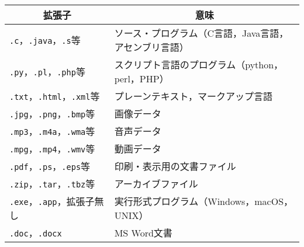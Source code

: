 \documentclass{standalone}
\begin{document}
\begin{tabular}{l|l}\hline\hline
  \multicolumn{1}{c|}{拡張子} & \multicolumn{1}{c}{意味} \\\hline
              {\tt .c}，{\tt .java}，{\tt .s}等     &
              ソース・プログラム（C言語，Java言語，アセンブリ言語）  \\
              {\tt .py}，{\tt .pl}，{\tt .php}等    &
              スクリプト言語のプログラム（python，perl，PHP）        \\
              {\tt .txt}，{\tt .html}，{\tt .xml}等 &
              プレーンテキスト，マークアップ言語                     \\
              {\tt .jpg}，{\tt .png}，{\tt .bmp}等  &
              画像データ                                             \\
              {\tt .mp3}，{\tt .m4a}，{\tt .wma}等  &
              音声データ                                             \\
              {\tt .mpg}，{\tt .mp4}，{\tt .wmv}等  &
              動画データ                                             \\
              {\tt .pdf}，{\tt .ps}，{\tt .eps}等   &
              印刷・表示用の文書ファイル                             \\
              {\tt .zip}，{\tt .tar}，{\tt .tbz}等  &
              アーカイブファイル                                     \\
              {\tt .exe}，{\tt .app}，拡張子無し    &
              実行形式プログラム（Windows，macOS，UNIX）             \\
              {\tt .doc}，{\tt .docx}               &
              MS Word文書                                            \\
\end{tabular}
\end{document}
